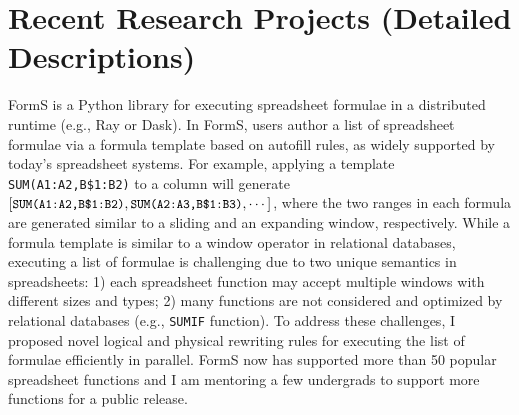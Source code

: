 \documentclass[10pt]{article} %
\newcommand{\form}[1]{\texttt{\small #1}}
\begin{document}
\section{Recent Research Projects (Detailed Descriptions)}

{FormS is a Python library for executing spreadsheet formulae 
in a distributed runtime (e.g., Ray or Dask). 
In FormS, users author a list of spreadsheet formulae 
via a formula template based on autofill rules, 
as widely supported by today's spreadsheet systems. 
For example, applying a template \form{SUM(A1:A2,B\$1:B2)} 
to a column will generate $[\form{SUM(A1:A2,B\$1:B2)}, 
\form{SUM(A2:A3,B\$1:B3)}, \cdots]$, where the two 
ranges in each formula 
are generated similar to a sliding and an expanding 
window, respectively. 
While a formula template is similar to a window operator 
in relational databases, executing a list of formulae is challenging 
due to two unique semantics in spreadsheets: 
1) each spreadsheet function may accept multiple windows 
with different sizes and types; 
2) many functions are not considered 
and optimized by relational databases (e.g., \form{SUMIF} function). 
To address these challenges, I proposed novel logical and physical 
rewriting rules for executing the list of formulae 
efficiently in parallel. FormS now has supported more than 50 popular spreadsheet functions 
and I am mentoring a few undergrads to support more functions for a public release.}
\end{document}
